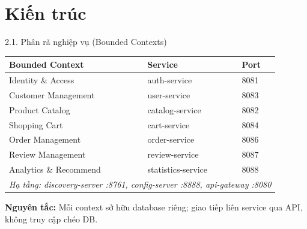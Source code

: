 \documentclass[aspectratio=169,12pt]{beamer}
\begin{document}
\section{Kiến trúc}

\begin{frame}{2.1. Phân rã nghiệp vụ (Bounded Contexts)}
  \small
  \begin{table}
    \centering
    \begin{tabular}{@{}lll@{}}
      \toprule
      \textbf{Bounded Context} & \textbf{Service} & \textbf{Port} \\
      \midrule
      Identity \& Access       & auth-service       & 8081 \\
      Customer Management      & user-service       & 8083 \\
      Product Catalog          & catalog-service    & 8082 \\
      Shopping Cart            & cart-service       & 8084 \\
      Order Management         & order-service      & 8086 \\
      Review Management        & review-service     & 8087 \\
      Analytics \& Recommend   & statistics-service & 8088 \\
      \midrule
      \multicolumn{3}{l}{\textit{Hạ tầng: discovery-server :8761, config-server :8888, api-gateway :8080}} \\
      \bottomrule
    \end{tabular}
  \end{table}

  \vspace{0.3em}
  \textbf{Nguyên tắc:} Mỗi context sở hữu database riêng; giao tiếp liên service qua API, không truy cập chéo DB.
\end{frame}
\end{document}
